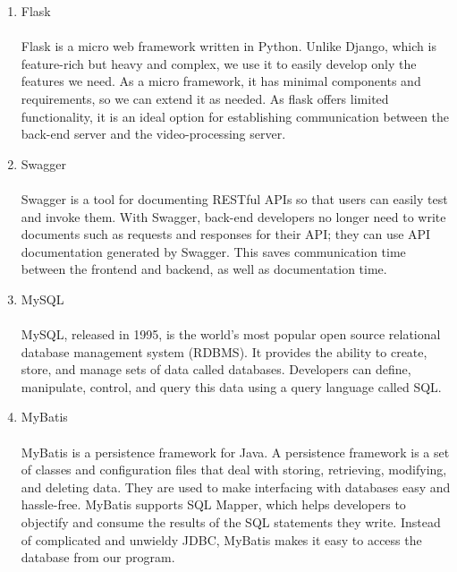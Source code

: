 \begin{enumerate}[label=\arabic*]
\begin{enumerate}[label=\alph*.]
              \item Flask\\
                    \\
                    Flask is a micro web framework written in Python. Unlike Django, which is feature-rich but heavy and complex, we use it to easily develop only the features we need. As a micro framework, it has minimal components and requirements, so we can extend it as needed. As flask offers limited functionality, it is an ideal option for establishing communication between the back-end server and the video-processing server.\\

              \item Swagger\\
                    \\
                    Swagger is a tool for documenting RESTful APIs so that users can easily test and invoke them. With Swagger, back-end developers no longer need to write documents such as requests and responses for their API; they can use API documentation generated by Swagger. This saves communication time between the frontend and backend, as well as documentation time.\\

              \item MySQL\\
                    \\
                    MySQL, released in 1995, is the world's most popular open source relational database management system (RDBMS). It provides the ability to create, store, and manage sets of data called databases. Developers can define, manipulate, control, and query this data using a query language called SQL. \\

              \item MyBatis\\
                    \\
                    MyBatis is a persistence framework for Java. A persistence framework is a set of classes and configuration files that deal with storing, retrieving, modifying, and deleting data. They are used to make interfacing with databases easy and hassle-free. MyBatis supports SQL Mapper, which helps developers to objectify and consume the results of the SQL statements they write. Instead of complicated and unwieldy JDBC, MyBatis makes it easy to access the database from our program.\\


\end{enumerate}
\end{enumerate}
